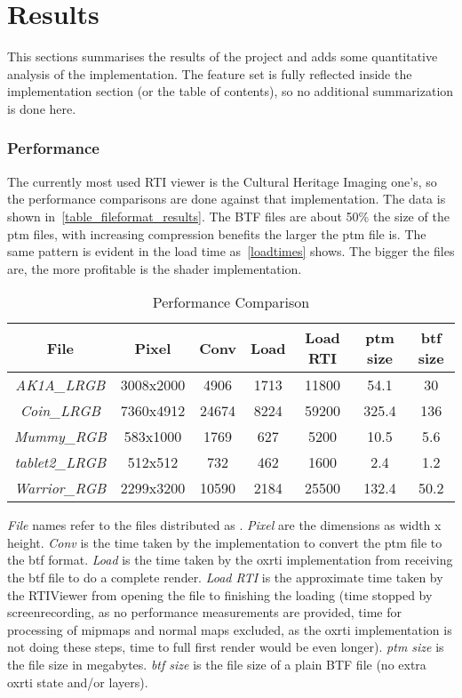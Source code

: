 \section{Results}
This sections summarises the results of the project and adds some quantitative
analysis of the implementation. The feature set is fully reflected inside the
implementation section (or the table of contents), so no additional
summarization is done here.

\subsubsection{Performance}
The currently most used RTI viewer is the Cultural Heritage Imaging
one's\cite*{noauthor_cultural_nodate-1}, so the performance comparisons are done
against that implementation. The data is shown
in~\autoref{table_fileformat_results}. The BTF files are about 50\% the size of
the ptm files, with increasing compression benefits the larger the ptm file is.
The same pattern is evident in the load time as~\autoref{loadtimes} shows. The
bigger the files are, the more profitable is the shader implementation.

\begin{table}[H]
\begin{tabular}{|c |  c c c c c c|}
 \hline
 File & Pixel & Conv & Load & Load RTI & ptm size & btf size\\
  \hline
  \emph{AK1A\_LRGB} & 3008x2000 & 4906 & 1713 & 11800 & 54.1 & 30  \\
  \emph{Coin\_LRGB} & 7360x4912 & 24674 & 8224 & 59200 & 325.4 & 136  \\
  \emph{Mummy\_RGB} & 583x1000 & 1769 & 627 & 5200 & 10.5 & 5.6  \\
  \emph{tablet2\_LRGB} & 512x512 & 732 & 462 & 1600 & 2.4 & 1.2  \\
  \emph{Warrior\_RGB} & 2299x3200 & 10590 & 2184 & 25500 & 132.4 & 50.2  \\
 \hline
\end{tabular}
\caption{Performance Comparison}
\emph{File} names refer to the files distributed as \cite*{goslar_oxrti_data:_2018}.
\emph{Pixel} are the dimensions as width x height. \emph{Conv} is the time taken
by the implementation to convert the ptm file to the btf format. \emph{Load} is
the time taken by the oxrti implementation from receiving the btf file to do a complete render. \emph{Load
  RTI} is the approximate time taken by the RTIViewer from opening the file to
finishing the loading (time stopped by screenrecording, as no performance
measurements are provided, time for processing of mipmaps and normal maps
excluded, as the oxrti implementation is not doing these steps, time to full
first render would be even longer). \emph{ptm size} is the file size in
megabytes. \emph{btf size} is the file size of a plain BTF file (no extra oxrti
state and/or layers).
\label{table_fileformat_results}
\end{table}

